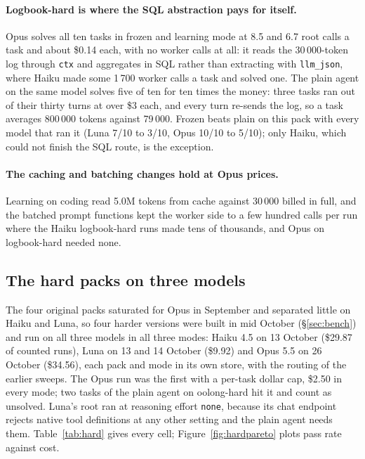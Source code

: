 \documentclass[11pt,a4paper]{article}
\newcommand{\code}[1]{\texttt{#1}}
\begin{document}
\paragraph{Logbook-hard is where the SQL abstraction pays for itself.}
Opus solves all ten tasks in frozen and learning mode at 8.5 and 6.7 root
calls a task and about \$0.14 each, with no worker calls at all: it reads
the 30\,000-token log through \code{ctx} and aggregates in SQL rather than
extracting with \code{llm\_json}, where Haiku made some 1\,700 worker calls
a task and solved one. The plain agent on the same model solves five of ten
for ten times the money: three tasks ran out of their thirty turns at over
\$3 each, and every turn re-sends the log, so a task averages 800\,000
tokens against 79\,000. Frozen beats plain on this pack with every model
that ran it (Luna 7/10 to 3/10, Opus 10/10 to 5/10); only Haiku, which
could not finish the SQL route, is the exception.

\paragraph{The caching and batching changes hold at Opus prices.} Learning
on coding read 5.0M tokens from cache against 30\,000 billed in full, and the
batched prompt functions kept the worker side to a few hundred calls per run
where the Haiku logbook-hard runs made tens of thousands, and Opus on
logbook-hard needed none.

\FloatBarrier
\subsection{The hard packs on three models}
\label{sec:hard}

The four original packs saturated for Opus in September and separated
little on Haiku and Luna, so four harder versions were built in mid October
(\S\ref{sec:bench}) and run on all three models in all three modes: Haiku
4.5 on 13 October (\$29.87 of counted runs), Luna on 13 and 14 October
(\$9.92) and Opus 5.5 on 26 October (\$34.56), each pack and mode in its
own store, with the routing of the earlier sweeps. The Opus run was the
first with a per-task dollar cap, \$2.50 in every mode; two tasks of the
plain agent on oolong-hard hit it and count as unsolved. Luna's root ran at
reasoning effort \code{none}, because its chat endpoint rejects native tool
definitions at any other setting and the plain agent needs them.
Table~\ref{tab:hard} gives every cell; Figure~\ref{fig:hardpareto} plots
pass rate against cost.
\end{document}
